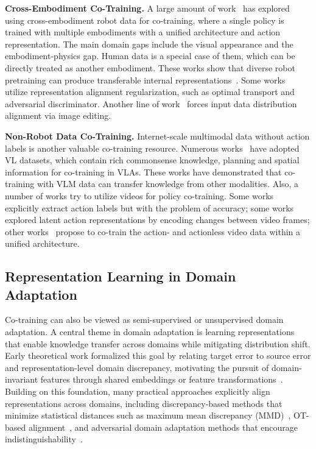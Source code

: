 \textbf{Cross-Embodiment Co-Training.}
A large amount of work~\cite{doshi2024scaling, yang2024pushing, o2024open, intelligence2025pi, yuan2025motiontrans} has explored using cross-embodiment robot data for co-training, where a single policy is trained with multiple embodiments with a unified architecture and action representation.
The main domain gaps include the visual appearance and the embodiment-physics gap.
Human data is a special case of them, which can be directly treated as another embodiment.
These works show that diverse robot pretraining can produce transferable internal representations~\cite{kareer2025emergence}.
Some works~\cite{cai2025n, kareer2025egomimic, punamiya2025egobridge} utilize representation alignment regularization, such as optimal transport and adversarial discriminator.
Another line of work~\cite{xu2025dexumi, lepert2025phantom, lepert2025masquerade} forces input data distribution alignment via image editing.


\textbf{Non-Robot Data Co-Training.}
Internet-scale multimodal data without action labels is another valuable co-training resource.
Numerous works~\cite{intelligence2025pi, lee2025molmoact, zawalski2024robotic, zitkovich2023rt, lin2026systematic} have adopted VL datasets, which contain rich commonsense knowledge, planning and spatial information for co-training in VLAs.
These works have demonstrated that co-training with VLM data can transfer knowledge from other modalities.
Also, a number of works try to utilize videos for policy co-training.
Some works~\cite{kareer2025egomimic, lepert2025masquerade, luo2025being} explicitly extract action labels but with the problem of accuracy;
some works~\cite{ye2024latent, zhou2024dino} explored latent action representations by encoding changes between video frames;
other works~\cite{li2025unified, zhu2025unified, liang2025video} propose to co-train the action- and actionless video data within a unified architecture.


\subsection{Representation Learning in Domain Adaptation}
Co-training can also be viewed as semi-supervised or unsupervised domain adaptation.
A central theme in domain adaptation is learning representations that enable knowledge transfer across domains while mitigating distribution shift. 
Early theoretical work formalized this goal by relating target error to source error and representation-level domain discrepancy, motivating the pursuit of domain-invariant features through shared embeddings or feature transformations~\cite{ben2010theory, mansour2009domain}.    
Building on this foundation, many practical approaches explicitly align representations across domains, including discrepancy-based methods that minimize statistical distances such as maximum mean discrepancy (MMD)~\cite{long2015learning}, OT-based alignment~\cite{courty2017joint, damodaran2018deepjdot}, and adversarial domain adaptation methods that encourage indistinguishability~\cite{ganin2016domain, tzeng2017adversarial}. 

